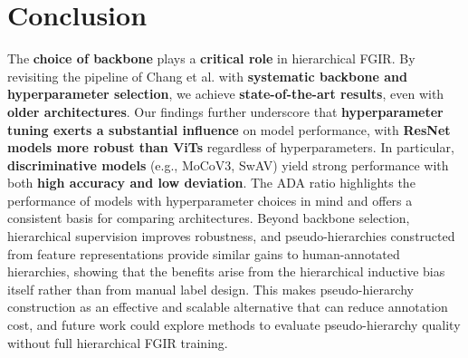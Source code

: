 \documentclass[conference]{IEEEtran}
\begin{document}
\section{Conclusion}
The \textbf{choice of backbone} plays a \textbf{critical role} in hierarchical FGIR. By revisiting the pipeline of Chang et al. \cite{chang_your_2021} with \textbf{systematic backbone and hyperparameter selection}, we achieve \textbf{state-of-the-art results}, even with \textbf{older architectures}. Our findings further underscore that \textbf{hyperparameter tuning exerts a substantial influence} on model performance, with \textbf{ResNet models more robust than ViTs} regardless of hyperparameters. In particular, \textbf{discriminative models} (e.g., MoCoV3, SwAV) yield strong performance with both \textbf{high accuracy and low deviation}. The ADA ratio highlights the performance of models with hyperparameter choices in mind and offers a consistent basis for comparing architectures. Beyond backbone selection, hierarchical supervision improves robustness, and pseudo-hierarchies constructed from feature representations provide similar gains to human-annotated hierarchies, showing that the benefits arise from the hierarchical inductive bias itself rather than from manual label design. This makes pseudo-hierarchy construction as an effective and scalable alternative that can reduce annotation cost, and future work could explore methods to evaluate pseudo-hierarchy quality without full hierarchical FGIR training.





\end{document}
